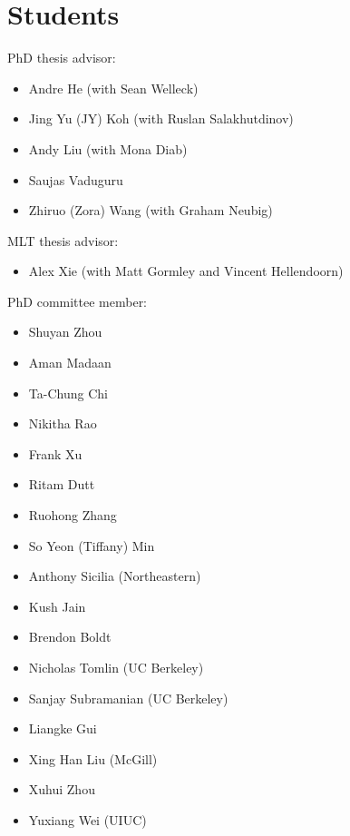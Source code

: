 


\section{Students}
PhD thesis advisor:
\begin{itemize}
  \item Andre He (with Sean Welleck)
  \item Jing Yu (JY) Koh (with Ruslan Salakhutdinov)
  \item Andy Liu (with Mona Diab)
  \item Saujas Vaduguru
  \item Zhiruo (Zora) Wang (with Graham Neubig)
\end{itemize}
MLT thesis advisor:
\begin{itemize}
  \item Alex Xie (with Matt Gormley and Vincent Hellendoorn)
\end{itemize}
PhD committee member:
\begin{itemize}
  \item Shuyan Zhou
  \item Aman Madaan
  \item Ta-Chung Chi
  \item Nikitha Rao
  \item Frank Xu
  \item Ritam Dutt
  \item Ruohong Zhang
  \item So Yeon (Tiffany) Min
  \item Anthony Sicilia (Northeastern)
  \item Kush Jain
  \item Brendon Boldt
  \item Nicholas Tomlin (UC Berkeley)
  \item Sanjay Subramanian (UC Berkeley)
  \item Liangke Gui
  \item Xing Han Liu (McGill)
  \item Xuhui Zhou
  \item Yuxiang Wei (UIUC)
\end{itemize}



